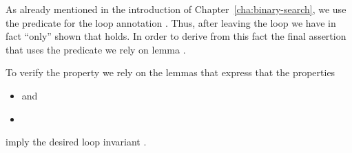 As already mentioned in the introduction of Chapter~\ref{cha:binary-search},
we use the predicate  for the loop annotation .
Thus, after leaving the loop we have in fact ``only'' shown that 
holds.
In order to derive from this fact the final assertion  that uses
the predicate  we rely on lemma .



To verify the property  we rely on the lemmas 
that express that the properties 

\begin{itemize}
\item {} and
\item {}
\end{itemize}

imply the desired loop invariant .


